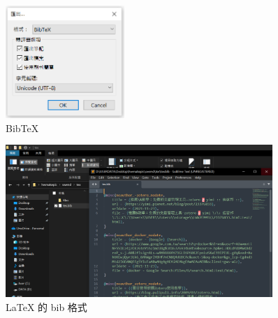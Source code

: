 \begin{figure}[htb]
\centering 
\includegraphics[width=0.40\textwidth]{img/c2m9.png} 
\caption{BibTeX}
\label{Test}
\end{figure}

\begin{figure}[htb]
\centering 
\includegraphics[width=0.90\textwidth]{img/c2m10.png} 
\caption{LaTeX 的 bib 格式}
\label{Test}
\end{figure}

